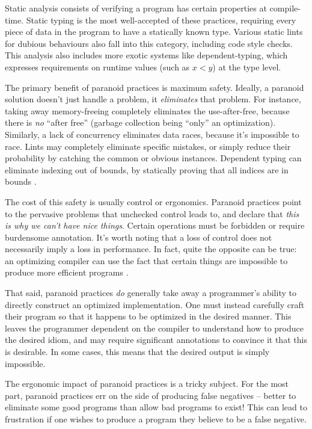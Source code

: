 Static analysis consists of verifying a program has certain properties at
compile-time. Static typing is the most well-accepted of these practices,
requiring every piece of data in the program to have a statically known type.
Various static lints for dubious behaviours also fall into this category,
including code style checks. This analysis also includes more exotic systems
like dependent-typing, which expresses requirements on runtime values (such as
$x < y$) at the type level.

The primary benefit of paranoid practices is maximum safety. Ideally, a paranoid
solution doesn't just handle a problem, it \emph{eliminates} that problem. For
instance, taking away memory-freeing completely eliminates the use-after-free,
because there is \emph{no} ``after free'' (garbage collection being ``only'' an
optimization). Similarly, a lack of concurrency eliminates data races, because
it's impossible to race. Lints may completely eliminate specific mistakes, or
simply reduce their probability by catching the common or obvious instances.
Dependent typing can eliminate indexing out of bounds, by statically proving
that all indices are in bounds \cite{xi1998eliminating}.

The cost of this safety is usually control or ergonomics. Paranoid practices
point to the pervasive problems that unchecked control leads to, and declare
that \emph{this is why we can't have nice things}. Certain operations must be
forbidden or require burdensome annotation. It's worth noting that a loss of
control does not necessarily imply a loss in performance. In fact, quite the
opposite can be true: an optimizing compiler can use the fact that certain
things are impossible to produce more efficient programs
\cite{coutts2007stream}.

That said, paranoid practices \emph{do} generally take away a programmer's ability to
directly construct an optimized implementation. One must instead carefully craft
their program so that it happens to be optimized in the desired manner. This
leaves the programmer dependent on the compiler to understand how to produce the
desired idiom, and may require significant annotations to convince it that this
is desirable. In some cases, this means that the desired output is simply
impossible.

The ergonomic impact of paranoid practices is a tricky subject. For the most
part, paranoid practices err on the side of producing false negatives -- better to
eliminate some good programs than allow bad programs to exist! This can lead to
frustration if one wishes to produce a program they believe to be a false
negative.

